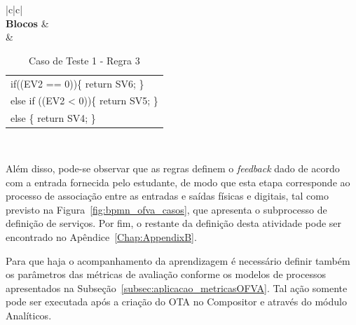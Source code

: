 

\begin{table}[htb]
	\caption{Caso de Teste 1 - Regra 3}
	\centering
	\begin{tabular}{|c|c|}
		\hline
		 \\ \hline
		\textbf{Blocos} &  \\ \hline
		 & \begin{tabular}[c]{@{}l@{}}if((EV2 == 0))\{   return SV6; \}\\ else if ((EV2 < 0))\{   return SV5; \}\\ else \{   return SV4; \} \end{tabular}  \\ \hline
	\end{tabular}
	\label{tabela:OTA_c1r3}
\end{table}

Além disso, pode-se observar que as regras definem o \textit{feedback} dado de acordo com a entrada fornecida pelo estudante, de modo que esta etapa corresponde ao processo de associação entre as entradas e saídas físicas e digitais, tal como previsto na Figura~\ref{fig:bpmn_ofva_casos}, que apresenta o subprocesso de definição de serviços. Por fim, o restante da definição desta atividade pode ser encontrado no Apêndice~\ref{Chap:AppendixB}.

Para que haja o acompanhamento da aprendizagem é necessário definir também os parâmetros das métricas de avaliação conforme os modelos de processos apresentados na Subseção~\ref{subsec:aplicacao_metricasOFVA}. Tal ação somente pode ser executada após a criação do OTA no Compositor e através do módulo Analíticos.


